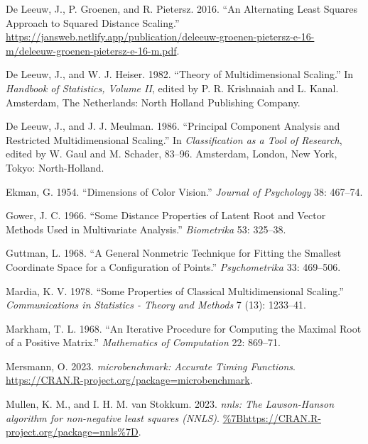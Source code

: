 \documentclass[
  12pt,
  letterpaper,
  DIV=11,
  numbers=noendperiod]{scrartcl}
\newlength{\cslhangindent}
\newenvironment{CSLReferences}[2] %
 {\begin{list}{}{%
  \setlength{\itemindent}{0pt}
  \setlength{\leftmargin}{0pt}
  \setlength{\parsep}{0pt}
  \ifodd #1
   \setlength{\leftmargin}{\cslhangindent}
   \setlength{\itemindent}{-1\cslhangindent}
  \fi
  \setlength{\itemsep}{#2\baselineskip}}}
 {\end{list}}
\begin{document}
\begin{CSLReferences}{1}{0}
De Leeuw, J., P. Groenen, and R. Pietersz. 2016. {``An Alternating Least
Squares Approach to Squared Distance Scaling.''}
\url{https://jansweb.netlify.app/publication/deleeuw-groenen-pietersz-e-16-m/deleeuw-groenen-pietersz-e-16-m.pdf}.

De Leeuw, J., and W. J. Heiser. 1982. {``Theory of Multidimensional
Scaling.''} In \emph{Handbook of Statistics, Volume {II}}, edited by P.
R. Krishnaiah and L. Kanal. Amsterdam, The Netherlands: North Holland
Publishing Company.

De Leeuw, J., and J. J. Meulman. 1986. {``Principal Component Analysis
and Restricted Multidimensional Scaling.''} In \emph{Classification as a
Tool of Research}, edited by W. Gaul and M. Schader, 83--96. Amsterdam,
London, New York, Tokyo: North-Holland.

Ekman, G. 1954. {``{Dimensions of Color Vision}.''} \emph{Journal of
Psychology} 38: 467--74.

Gower, J. C. 1966. {``{Some Distance Properties of Latent Root and
Vector Methods Used in Multivariate Analysis}.''} \emph{Biometrika} 53:
325--38.

Guttman, L. 1968. {``{A General Nonmetric Technique for Fitting the
Smallest Coordinate Space for a Configuration of Points}.''}
\emph{Psychometrika} 33: 469--506.

Mardia, K. V. 1978. {``Some Properties of Classical Multidimensional
Scaling.''} \emph{Communications in Statistics - Theory and Methods} 7
(13): 1233--41.

Markham, T. L. 1968. {``An Iterative Procedure for Computing the Maximal
Root of a Positive Matrix.''} \emph{Mathematics of Computation} 22:
869--71.

Mersmann, O. 2023. \emph{{microbenchmark: Accurate Timing Functions}}.
\url{https://CRAN.R-project.org/package=microbenchmark}.

Mullen, K. M., and I. H. M. van Stokkum. 2023. \emph{{nnls: The
Lawson-Hanson algorithm for non-negative least squares (NNLS)}}.
\url{\%7Bhttps://CRAN.R-project.org/package=nnls\%7D}.


\end{CSLReferences}
\end{document}
